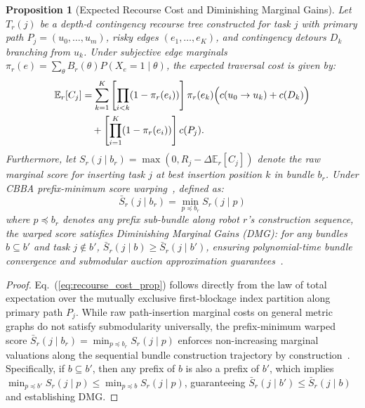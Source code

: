 \documentclass[lettersize,journal]{IEEEtran}
\newtheorem{proposition}{Proposition}
\begin{document}
\begin{proposition}[Expected Recourse Cost and Diminishing Marginal Gains]
Let $T_r(j)$ be a depth-$d$ contingency recourse tree constructed for task $j$ with primary path $P_j = (u_0, \dots, u_m)$, risky edges $(e_1, \dots, e_K)$, and contingency detours $D_k$ branching from $u_k$. Under subjective edge marginals $\pi_r(e) = \sum_{\theta} B_r(\theta) P(X_e = 1 \mid \theta)$, the expected traversal cost is given by:
\begin{align}
    \mathbb{E}_r[C_j] &= \sum_{k=1}^K \left[ \prod_{i < k} (1 - \pi_r(e_i)) \right] \pi_r(e_k) \Big( c(u_0 \to u_k) + c(D_k) \Big) \notag \\
    &\quad + \left[ \prod_{i=1}^K (1 - \pi_r(e_i)) \right] c(P_j).
\label{eq:recourse_cost_prop}
\end{align}
Furthermore, let $S_r(j \mid b_r) = \max(0, R_j - \Delta \mathbb{E}_r[C_j])$ denote the raw marginal score for inserting task $j$ at best insertion position $k$ in bundle $b_r$. Under CBBA prefix-minimum score warping~\cite{choi2009cbba}, defined as:
\begin{equation}
    \bar{S}_r(j \mid b_r) = \min_{p \preceq b_r} S_r(j \mid p)
\label{eq:bundle_dmg_score}
\end{equation}
where $p \preceq b_r$ denotes any prefix sub-bundle along robot $r$'s construction sequence, the warped score satisfies Diminishing Marginal Gains (DMG): for any bundles $b \subseteq b'$ and task $j \notin b'$, $\bar{S}_r(j \mid b) \ge \bar{S}_r(j \mid b')$, ensuring polynomial-time bundle convergence and submodular auction approximation guarantees~\cite{choi2009cbba}.
\label{prop:recourse_dmg}
\end{proposition}
\begin{proof}
Eq.~(\ref{eq:recourse_cost_prop}) follows directly from the law of total expectation over the mutually exclusive first-blockage index partition along primary path $P_j$. While raw path-insertion marginal costs on general metric graphs do not satisfy submodularity universally, the prefix-minimum warped score $\bar{S}_r(j \mid b_r) = \min_{p \preceq b_r} S_r(j \mid p)$ enforces non-increasing marginal valuations along the sequential bundle construction trajectory by construction~\cite{choi2009cbba}. Specifically, if $b \subseteq b'$, then any prefix of $b$ is also a prefix of $b'$, which implies $\min_{p \preceq b'} S_r(j \mid p) \le \min_{p \preceq b} S_r(j \mid p)$, guaranteeing $\bar{S}_r(j \mid b') \le \bar{S}_r(j \mid b)$ and establishing DMG.
\end{proof}
\end{document}
